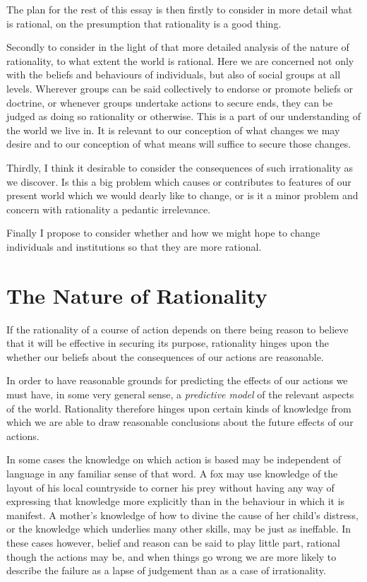 The plan for the rest of this essay is then firstly to consider in more detail what is rational, on the presumption that rationality is a good thing.

Secondly to consider in the light of that more detailed analysis of the nature of rationality, to what extent the world is rational.
Here we are concerned not only with the beliefs and behaviours of individuals, but also of social groups at all levels.
Wherever groups can be said collectively to endorse or promote beliefs or doctrine, or whenever groups undertake actions to secure ends, they can be judged as doing so rationality or otherwise.
This is a part of our understanding of the world we live in.
It is relevant to our conception of what changes we may desire and to our conception of what means will suffice to secure those changes.

Thirdly, I think it desirable to consider the consequences of such irrationality as we discover.
Is this a big problem which causes or contributes to features of our present world which we would dearly like to change, or is it a minor problem and concern with rationality a pedantic irrelevance.

Finally I propose to consider whether and how we might hope to change individuals and institutions so that they are more rational.

\section{The Nature of Rationality}

If the rationality of a course of action depends on there being reason to believe that it will be effective in securing its purpose, rationality hinges upon the whether our beliefs about the consequences of our actions are reasonable.

In order to have reasonable grounds for predicting the effects of our actions we must have, in some very general sense, a {\it predictive model} of the relevant aspects of the world.
Rationality therefore hinges upon certain kinds of knowledge from which we are able to draw reasonable conclusions about the future effects of our actions.

In some cases the knowledge on which action is based may be independent of language in any familiar sense of that word.
A fox may use knowledge of the layout of his local countryside to corner his prey without having any way of expressing that knowledge more explicitly than in the behaviour in which it is manifest.
A mother's knowledge of how to divine the cause of her child's distress, or the knowledge which underlies many other skills, may be just as ineffable.
In these cases however, belief and reason can be said to play little part, rational though the actions may be, and when things go wrong we are more likely to describe the failure as a lapse of judgement than as a case of irrationality.

